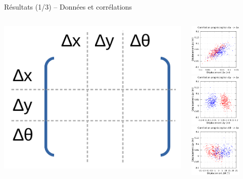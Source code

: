 \begin{frame}{Résultats (1/3) -- Données et corrélations}
    \begin{columns}
        \begin{column}{0.35\linewidth}
            \includegraphics[type=pdf,ext=.pdf,read=.pdf,width=0.8\linewidth]{../schema/correlation_matrix}
        \end{column}
        \begin{column}{0.65\linewidth}
            \includegraphics[type=pdf,ext=.pdf,read=.pdf,width=2.5cm]{../plot/OdometryLWPR/grass_close_function_read_x_x}
            \includegraphics[type=pdf,ext=.pdf,read=.pdf,width=2.5cm]{../plot/OdometryLWPR/grass_close_function_read_y_x}
            \includegraphics[type=pdf,ext=.pdf,read=.pdf,width=2.5cm]{../plot/OdometryLWPR/grass_close_function_read_yaw_x}
            \vspace{0.2cm}

\end{column}
\end{columns}
\end{frame}
